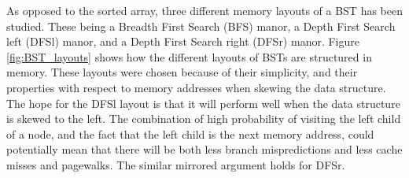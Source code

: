 \documentclass{article}
\begin{document}
As opposed to the sorted array, three different memory layouts of a BST has been studied. These being a Breadth First Search (BFS) manor, a Depth First Search left (DFSl) manor, and a Depth First Search right (DFSr) manor. Figure \ref{fig:BST_layouts} shows how the different layouts of BSTs are structured in memory. These layouts were chosen because of their simplicity, and their properties with respect to memory addresses when skewing the data structure. The hope for the DFSl layout is that it will perform well when the data structure is skewed to the left. The combination of high probability of visiting the left child of a node, and the fact that the left child is the next memory address, could potentially mean that there will be both less branch mispredictions and less cache misses and pagewalks. The similar mirrored argument holds for DFSr.
\end{document}
